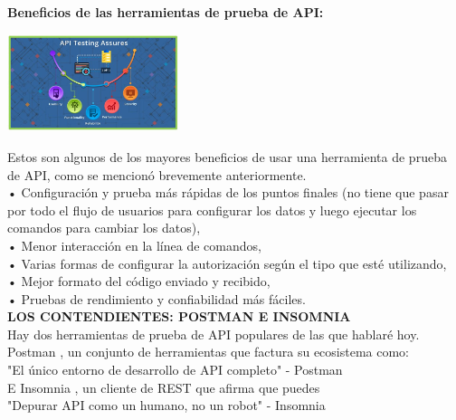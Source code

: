 \documentclass[twoside,twocolumn]{article}
\begin{document}
\textbf{Beneficios de las herramientas de prueba de API:}\\
\begin{center}
	\includegraphics[width=5cm]{./img/1.png} 
\end{center}

Estos son algunos de los mayores beneficios de usar una herramienta de prueba de API, como se mencionó brevemente anteriormente.
\\•	Configuración y prueba más rápidas de los puntos finales (no tiene que pasar por todo el flujo de usuarios para configurar los datos y luego ejecutar los comandos para cambiar los datos),
\\•	Menor interacción en la línea de comandos,
\\•	Varias formas de configurar la autorización según el tipo que esté utilizando,
\\•	Mejor formato del código enviado y recibido,
\\•	Pruebas de rendimiento y confiabilidad más fáciles.
\\

\textbf{LOS CONTENDIENTES: POSTMAN E INSOMNIA}\\
Hay dos herramientas de prueba de API populares de las que hablaré hoy. Postman , un conjunto de herramientas que factura su ecosistema como:
\\"El único entorno de desarrollo de API completo" - Postman
\\E Insomnia , un cliente de REST que afirma que puedes
\\"Depurar API como un humano, no un robot" - Insomnia
\\
\end{document}
